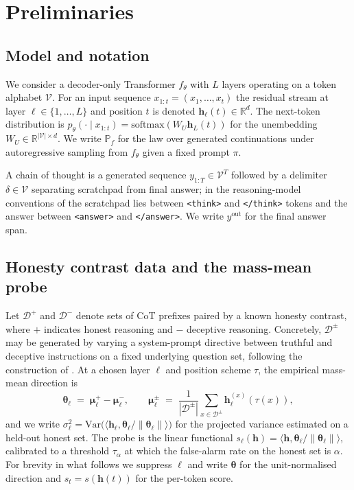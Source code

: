 \documentclass[11pt]{article}
\theoremstyle{definition}
\newcommand{\R}{\mathbb{R}}
\newcommand{\Prob}{\mathbb{P}}
\newcommand{\1}{\mathbf{1}}
\newcommand{\hh}{\bm{h}}
\newcommand{\mumu}{\bm{\mu}}
\newcommand{\thetab}{\bm{\theta}}
\begin{document}
\section{Preliminaries}
\label{sec:prelim}

\subsection{Model and notation}

We consider a decoder-only Transformer $f_{\theta}$ with $L$ layers operating on a token alphabet $\mathcal{V}$. For an input sequence $x_{1:t} = (x_1, \dots, x_t)$ the residual stream at layer $\ell \in \{1, \dots, L\}$ and position $t$ is denoted $\hh_{\ell}(t) \in \R^d$. The next-token distribution is $p_{\theta}(\cdot \mid x_{1:t}) = \mathrm{softmax}(W_U \hh_L(t))$ for the unembedding $W_U \in \R^{|\mathcal{V}| \times d}$. We write $\Prob_{f}$ for the law over generated continuations under autoregressive sampling from $f_{\theta}$ given a fixed prompt $\pi$.

A chain of thought is a generated sequence $y_{1:T} \in \mathcal{V}^T$ followed by a delimiter $\delta \in \mathcal{V}$ separating scratchpad from final answer; in the reasoning-model conventions of \citet{deepseekR1,muennighoff2025s1} the scratchpad lies between \texttt{<think>} and \texttt{</think>} tokens and the answer between \texttt{<answer>} and \texttt{</answer>}. We write $y^{\mathrm{out}}$ for the final answer span.

\subsection{Honesty contrast data and the mass-mean probe}

Let $\mathcal{D}^{+}$ and $\mathcal{D}^{-}$ denote sets of CoT prefixes paired by a known honesty contrast, where $+$ indicates honest reasoning and $-$ deceptive reasoning. Concretely, $\mathcal{D}^{\pm}$ may be generated by varying a system-prompt directive between truthful and deceptive instructions on a fixed underlying question set, following the construction of \citet{goldowsky2025deception}. At a chosen layer $\ell$ and position scheme $\tau$, the empirical mass-mean direction is
\[
\thetab_{\ell} \;=\; \mumu^{+}_{\ell} - \mumu^{-}_{\ell}, \qquad
\mumu^{\pm}_{\ell} \;=\; \frac{1}{|\mathcal{D}^{\pm}|} \sum_{x \in \mathcal{D}^{\pm}} \hh_{\ell}^{(x)}(\tau(x)),
\]
and we write $\sigma_{\ell}^{2} = \mathrm{Var}\bigl(\langle \hh_{\ell}, \thetab_{\ell} / \|\thetab_{\ell}\| \rangle\bigr)$ for the projected variance estimated on a held-out honest set. The probe is the linear functional $s_{\ell}(\hh) = \langle \hh, \thetab_{\ell} / \|\thetab_{\ell}\| \rangle$, calibrated to a threshold $\tau_{\alpha}$ at which the false-alarm rate on the honest set is $\alpha$. For brevity in what follows we suppress $\ell$ and write $\thetab$ for the unit-normalised direction and $s_t = s(\hh(t))$ for the per-token score.
\end{document}
